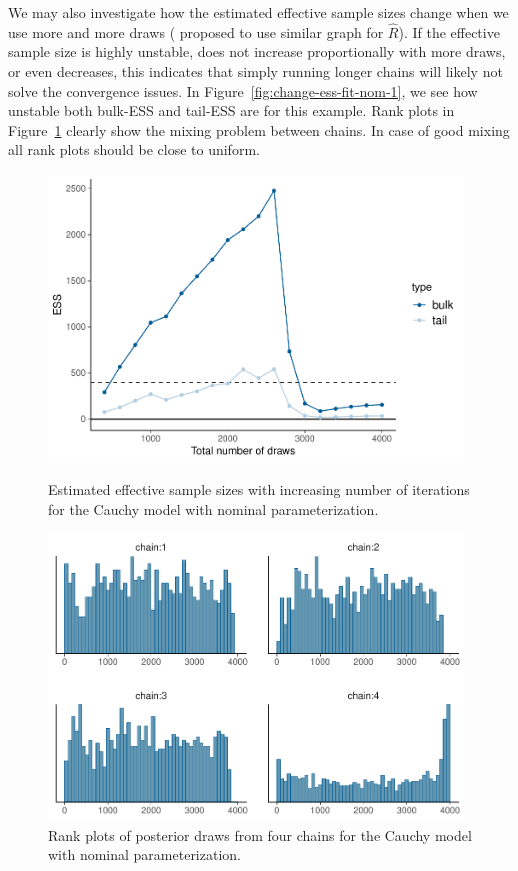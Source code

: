\documentclass[american,]{article}
\begin{document}
We may also investigate how the estimated effective sample sizes
change when we use more and more draws (\citet{Brooks+Gelman:1998}
proposed to use similar graph for \(\widehat{R}\)). If the effective
sample size is highly unstable, does not increase proportionally with
more draws, or even decreases, this indicates that simply running
longer chains will likely not solve the convergence issues. In
Figure~\ref{fig:change-ess-fit-nom-1}, we see how unstable both
bulk-ESS and tail-ESS are for this example.
%
Rank plots in Figure~\ref{fig:hist-fit-nom-1} clearly show the
mixing problem between chains. In case of good mixing all rank plots
should be close to uniform.

\begin{figure}[tp]
  \centering
  \begin{minipage}{0.48\textwidth}
  \includegraphics[width=0.98\textwidth]{graphics/change-ess-fit-nom-1.pdf}
  \caption{Estimated effective sample sizes with increasing number of iterations
  for the Cauchy model with nominal parameterization.}
  \label{fig:change-ess-fit-nom-1}
\end{minipage}
\hfill
\begin{minipage}{0.48\textwidth}
  \includegraphics[width=0.98\textwidth]{graphics/hist-fit-nom-1.pdf}
  \caption{Rank plots of posterior draws from four chains for the Cauchy model 
  with nominal parameterization.}
  \label{fig:hist-fit-nom-1}
\end{minipage}
\end{figure}
\end{document}
